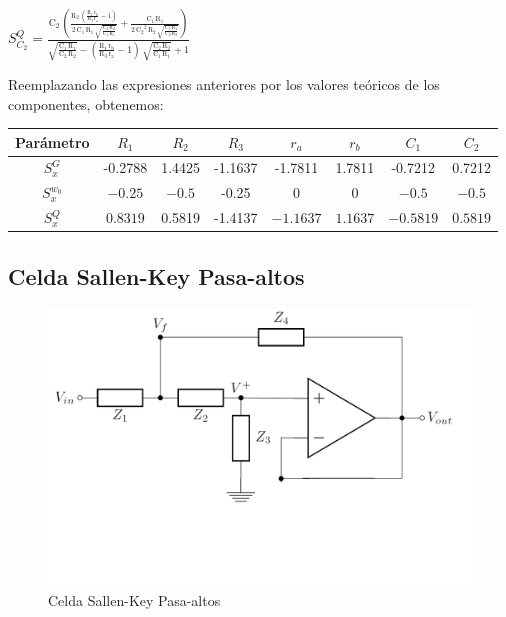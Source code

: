 \documentclass[../tc_tpfinal_main.tex]{subfiles}
\begin{document}
$S^{Q}_{C_2} = \frac{\mathrm{C_2}\, \left(\frac{\mathrm{R_2}\, \left(\frac{\mathrm{R_1}\, \mathrm{r_b}}{\mathrm{R_3}\, \mathrm{r_a}} - 1\right)}{2\, \mathrm{C_1}\, \mathrm{R_1}\, \sqrt{\frac{\mathrm{C_2}\, \mathrm{R_2}}{\mathrm{C_1}\, \mathrm{R_1}}}} + \frac{\mathrm{C_1}\, \mathrm{R_1}}{2\, {\mathrm{C_2}}^2\, \mathrm{R_2}\, \sqrt{\frac{\mathrm{C_1}\, \mathrm{R_1}}{\mathrm{C_2}\, \mathrm{R_2}}}}\right)}{\sqrt{\frac{\mathrm{C_1}\, \mathrm{R_1}}{\mathrm{C_2}\, \mathrm{R_2}}} - \left(\frac{\mathrm{R_1}\, \mathrm{r_b}}{\mathrm{R_3}\, \mathrm{r_a}} - 1\right)\, \sqrt{\frac{\mathrm{C_2}\, \mathrm{R_2}}{\mathrm{C_1}\, \mathrm{R_1}}} + 1}$\par

Reemplazando las expresiones anteriores por los valores teóricos de los componentes, obtenemos:
			 	\begin{table}[H] 
				\centering
 				\begin{tabular}{||c c c c c c c c||} 
 					\hline
				  Parámetro& $R_1$ & $R_2$ & $R_3$ & $r_a$ & $r_b$&$C_1$&$C_2$\\ [0.5ex] 
 					\hline\hline
					 $S^G_x$& -0.2788& 1.4425& -1.1637&-1.7811&1.7811&-0.7212&0.7212\\
					 $S^{w_0}_x$& $-0.25$ &$-0.5$&-0.25&$0$&$0$&$-0.5$&$-0.5$\\
					 $S^{Q}_x$ &$0.8319$& 0.5819& -1.4137&$-1.1637$&$1.1637$&$-0.5819$&$0.5819$\\[1ex] 
					\hline
				\end{tabular}
			\end{table}
\subsection{Celda Sallen-Key Pasa-altos}
\begin{figure}[H]	
	\centering
	\includegraphics[scale=0.5]{imagenes/sallen_key_circ.png}
	\caption{Celda Sallen-Key Pasa-altos}
	\label{fig:tpfinal_sallen_key_circ}
\end{figure}
\end{document}
